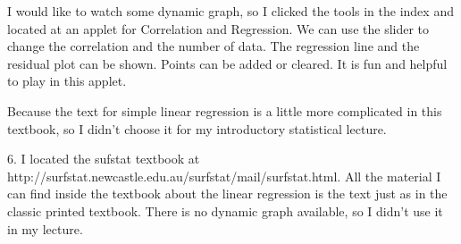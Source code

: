 I would like to watch some dynamic graph, so I clicked the tools in the index 
and located at an applet for Correlation and Regression. We can use the slider 
to change the correlation and the number of data. The regression line and the 
residual plot can be shown. Points can be added or cleared. It is fun and 
helpful to play in this applet.

Because the text for simple linear regression is a little more complicated in 
this textbook, so I didn't choose it for my introductory statistical lecture.

6. I located the sufstat textbook at 
http://surfstat.newcastle.edu.au/surfstat/mail/surfstat.html. All the material 
I can find inside the textbook about the linear regression is the text just as 
in the classic printed textbook. There is no dynamic graph available, so I 
didn't use it in my lecture.

